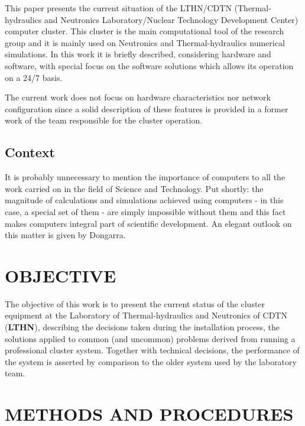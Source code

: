 \documentclass[twoside,a4paper,12pt,english]{inac19}
\begin{document}
This paper presents the current situation of the LTHN/CDTN (Thermal-hydraulics and Neutronics
Laboratory/Nuclear Technology Development Center) computer cluster. This cluster is the main 
computational tool of the research group and it is mainly used on Neutronics and Thermal-hydraulics 
numerical simulations. In this work it is briefly described, considering hardware and software, 
with special focus on the software solutions which allows its operation on a 24/7 basis.

The current work does not focus on hardware characteristics nor network configuration since 
a solid description of these features is provided in a former work of the team responsible 
for the cluster operation\cite{cluster17}.

\subsection{Context}

It is probably unnecessary to mention the importance of computers to all the work carried on 
in the field of Science and Technology. Put shortly: the magnitude of calculations and simulations 
achieved using computers - in this case, a special set of them - are simply impossible without 
them and this fact makes computers integral part of scientific development. An elegant outlook 
on this matter is given by Dongarra\cite{Dongarra2017}.

\section{OBJECTIVE}

The objective of this work is to present the current status of the cluster equipment 
at the Laboratory of Thermal-hydraulics and Neutronics of CDTN (\textbf{LTHN}), describing the decisions 
taken during the installation process, the solutions applied to common (and uncommon) problems 
derived from running a professional cluster system. Together with technical decisions, the 
performance of the system is asserted by comparison to the older system used by the laboratory 
team. 


\section{METHODS AND PROCEDURES}
\end{document}
